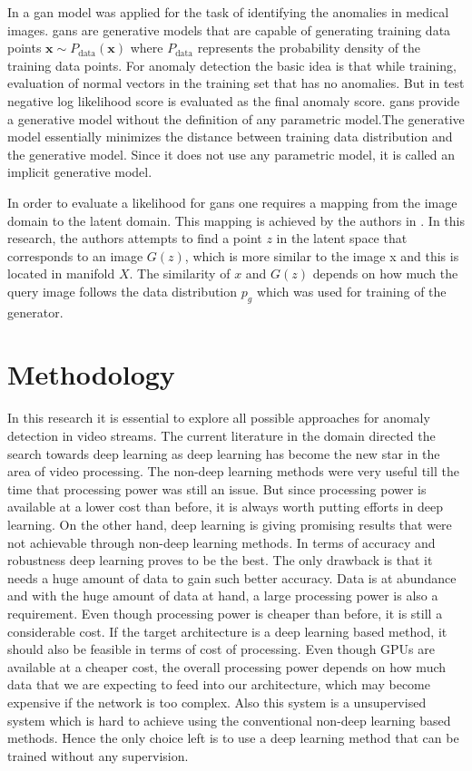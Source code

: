 \documentclass[a4paper,12pt]{report}
\begin{document}
\begin{itemize}
In \cite{67} a \gls{gan} model was applied for the task of identifying the anomalies in medical images. \gls{gan}s are generative models that are capable of generating training data points $\mathbf { x } \sim P _ { \mathrm { data } } ( \mathbf { x } )$  where $P _ { \mathrm { data } }$ represents the probability density of the training data points. For anomaly detection the basic idea is that while training, evaluation of normal vectors in the training set that has no anomalies. But in test negative log likelihood score is evaluated as the final anomaly score. \gls{gan}s provide a generative model without the definition of any parametric model.The generative model essentially minimizes the distance between training data distribution and the generative model. Since it does not use any parametric model, it is called an implicit generative model.  

In order to evaluate a likelihood for \gls{gan}s one requires a mapping from the image domain to the latent domain. This mapping is achieved by the authors in \cite{67}. In this research, the authors attempts to find a point $z$ in the latent space that corresponds to an image $G(z)$, which is more similar to the image x and this is located in manifold $X$. The similarity  of $x$ and $G(z)$  depends on how much the query image follows the data distribution $p_g$ which was used for training of the generator. 






\chapter{Methodology}
\newpage

In this research it is essential to explore all possible approaches for anomaly detection in video streams. The current literature in the domain directed the search towards deep learning as deep learning has become the new star in the area of video processing. The non-deep learning methods were very useful till the time that processing power was still an issue. But since processing power is available at a lower cost than before, it is always worth putting efforts in deep learning. On the other hand, deep learning is giving promising results that were not achievable through non-deep learning methods. In terms of accuracy and robustness deep learning proves to be the best. The only drawback is that it needs a huge amount of data to gain such better accuracy. Data is at abundance and with the huge amount of data at hand, a large processing power is also a requirement. Even though processing power is cheaper than before, it is still a considerable cost. If the target architecture is a deep learning based method, it should also be feasible in terms of cost of processing. Even though GPUs are available at a cheaper cost, the overall processing power depends on how much data that we are expecting to feed into our architecture, which may become expensive if the network is too complex. Also this system is a unsupervised system which is hard to achieve using the conventional non-deep learning based methods. Hence the only choice left is to use a deep learning method that can be trained without any supervision. 



\end{itemize}
\end{document}
